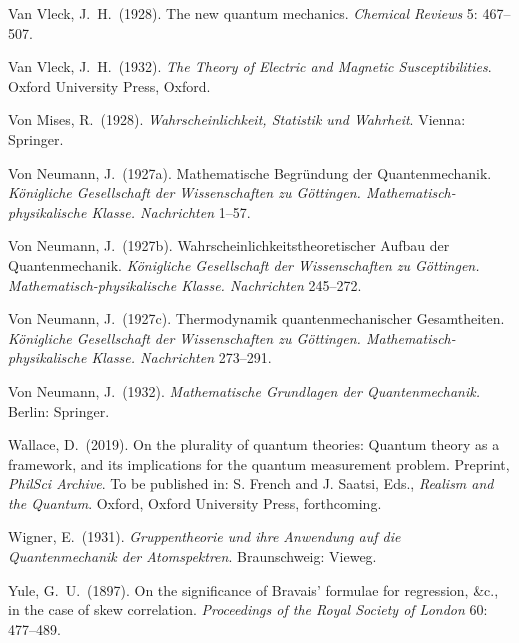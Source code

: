 \documentclass[12pt]{article}
\numberwithin{equation}{section}
\begin{document}
\begin{thebibliography}{}
 Van Vleck, J.\ H.\ (1928). The new quantum mechanics. \emph{Chemical Reviews} 5: 467--507.

 Van Vleck, J.\ H.\ (1932). \emph{The Theory of Electric and Magnetic Susceptibilities}. Oxford University Press, Oxford.

 Von Mises, R.\ (1928). \emph{Wahrscheinlichkeit, Statistik und Wahrheit}. Vienna: Springer.  

 Von Neumann, J.\ (1927a). Mathematische Begr\"undung der Quantenmechanik.  \emph{K\"onigliche Gesellschaft der Wissenschaften zu G\"ottingen. Mathematisch-physikalische Klasse. Nachrichten} 1--57.

 Von Neumann, J.\ (1927b). Wahrscheinlichkeitstheoretischer Aufbau der Quantenmechanik.  \emph{K\"onigliche Gesellschaft der Wissenschaften zu G\"ottingen. Mathematisch-physikalische Klasse. Nachrichten} 245--272.

 Von Neumann, J.\ (1927c). Thermodynamik quantenmechanischer Gesamtheiten. \emph{K\"onigliche Gesellschaft der Wissenschaften zu G\"ottingen. Mathematisch-physikalische Klasse. Nachrichten} 273--291.

 Von Neumann, J.\ (1932). \emph{Mathematische Grundlagen der Quantenmechanik.} Berlin: Springer.


 Wallace, D.\ (2019). On the plurality of quantum theories: Quantum theory as a framework, and its implications for the quantum measurement problem. Preprint, \emph{PhilSci Archive}. To be published in: S. French and J. Saatsi, Eds., \emph{Realism and the Quantum}. Oxford, Oxford University Press, forthcoming.

 Wigner, E.\ (1931). \emph{Gruppentheorie und ihre Anwendung auf die Quantenmechanik der Atomspektren}. Braunschweig: Vieweg. 

 Yule, G.\ U.\ (1897). On the significance of Bravais' formulae for regression, \&c., in the case of skew correlation. \emph{Proceedings of the Royal Society of London} 60: 477--489. 

  

\end{thebibliography}
\end{document}
